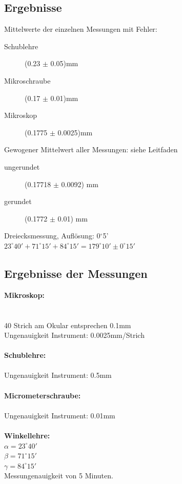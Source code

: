 \documentclass[12pt,a4paper]{article}
\begin{document}
\begin{multicols}{2}
\subsection{Ergebnisse}
Mittelwerte der einzelnen Messungen mit Fehler:
\begin{description}
	\item[Schublehre]  (0.23 $\pm$ 0.05)mm
	\item[Mikroschraube] (0.17 $\pm$ 0.01)mm
	\item[Mikroskop] (0.1775 $\pm$ 0.0025)mm
\end{description}
Gewogener Mittelwert aller Messungen: siehe Leitfaden
\begin{description}
				\item[ungerundet] (0.17718 $\pm$ 0.0092) mm 
				\item[gerundet] (0.1772 $\pm$ 0.01) mm
\end{description}
Dreiecksmessung, Auflösung: 0$^{\circ}$5'\\
$23^{\circ}40' + 71^{\circ}15' + 84^{\circ}15'=179^{\circ}10'\pm0^{\circ}15'$
\subsection{Ergebnisse der Messungen}
\textbf{Mikroskop:}\\
\\
\\
40 Strich am Okular entsprechen 0.1mm\\
Ungenauigkeit Instrument: 0.0025mm/Strich\\
\\
\textbf{Schublehre:}\\
\\
Ungenauigkeit Instrument: 0.5mm\\
\\
\textbf{Micrometerschraube:}\\
\\
Ungenauigkeit Instrument: 0.01mm\\
\\
\textbf{Winkellehre:}\\
$\alpha =  23^{\circ} 40'$\\
$\beta = 71^{\circ} 15' $\\
$\gamma =  84^{\circ} 15' $\\
Messungenauigkeit von 5 Minuten.\\


\end{multicols}
\end{document}
